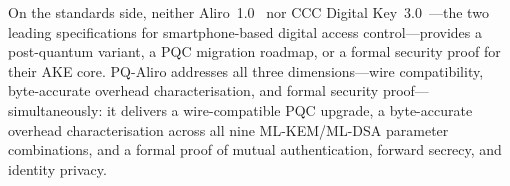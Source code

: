 On the standards side, neither Aliro~1.0~\cite{CSA:Aliro10} nor CCC Digital
Key~3.0~\cite{CCC:DigKey3}---the two leading specifications for smartphone-based
digital access control---provides a post-quantum variant, a PQC migration
roadmap, or a formal security proof for their AKE core.
PQ-Aliro addresses all three dimensions---wire compatibility, byte-accurate
overhead characterisation, and formal security proof---simultaneously: it
delivers a wire-compatible PQC upgrade, a byte-accurate overhead
characterisation across all nine ML-KEM/ML-DSA parameter combinations, and a
formal proof of mutual authentication, forward secrecy, and identity privacy.
